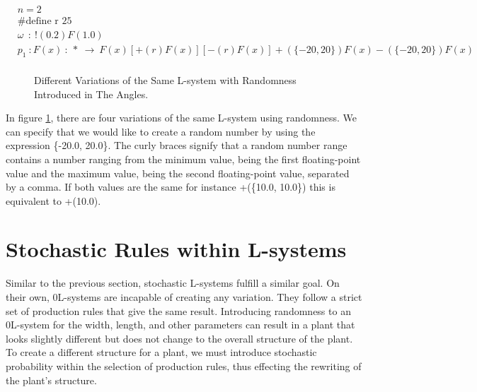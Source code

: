 \begin{equation} \label{randomness example}
\begin{aligned}
	&n=2\\
	&\text{\#define r 25} \\
	&\omega~~ :~ !(0.2)F(1.0)\\
	&p_1~ :  F(x)~ :~ *~ \rightarrow~ F(x)[+(r)F(x)][-(r)F(x)]+(\{-20, 20\})F(x)-(\{-20, 20\})F(x)\\
\end{aligned}
\end{equation}

\begin{figure}[htbp]

	{\centering
		\setlength{\fboxrule}{0pt}
		\caption{Different Variations of the Same L-system with Randomness Introduced in The Angles. \label{figRandomness}}
	}
\end{figure}
\FloatBarrier

\noindent
In figure \ref{figRandomness}, there are four variations of the same L-system using randomness. We can specify that we would like to create a random number by using the expression \{-20.0, 20.0\}. The curly braces signify that a random number range contains a number ranging from the minimum value, being the first floating-point value and the maximum value, being the second floating-point value, separated by a comma. If both values are the same for instance +(\{10.0, 10.0\}) this is equivalent to +(10.0).

\section{Stochastic Rules within L-systems} \label{Stochastic L-system Subsection}

Similar to the previous section, stochastic L-systems fulfill a similar goal. On their own, 0L-systems are incapable of creating any variation. They follow a strict set of production rules that give the same result. Introducing randomness to an 0L-system for the width, length, and other parameters can result in a plant that looks slightly different but does not change to the overall structure of the plant. To create a different structure for a plant, we must introduce stochastic probability within the selection of production rules, thus effecting the rewriting of the plant's structure.


